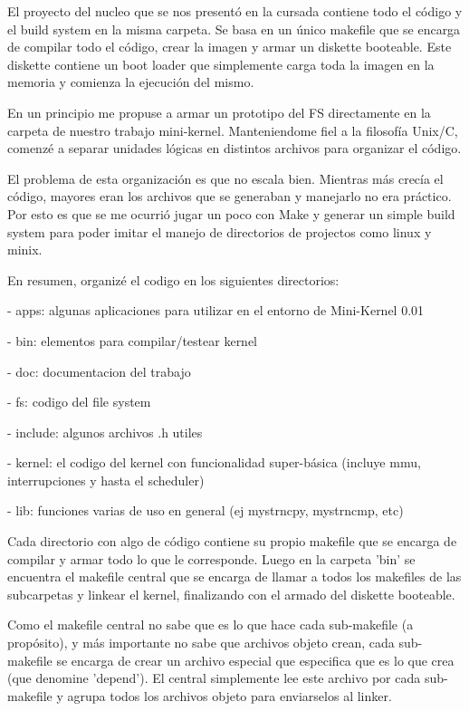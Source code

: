 El proyecto del nucleo que se nos presentó en la cursada contiene todo el código
y el build system en la misma carpeta. Se basa en un único makefile que se
encarga de compilar todo el código, crear la imagen y armar un diskette booteable.
Este diskette contiene un boot loader que simplemente carga toda la imagen en la
memoria y comienza la ejecución del mismo.

En un principio me propuse a armar un prototipo del FS directamente en la
carpeta de nuestro trabajo mini-kernel. Manteniendome fiel a la filosofía
Unix/C, comenzé a separar unidades lógicas en distintos archivos para organizar
el código.

El problema de esta organización es que no escala bien. Mientras más crecía el
código, mayores eran los archivos que se generaban y manejarlo no era práctico.
Por esto es que se me ocurrió jugar un poco con Make y generar un simple build
system para poder imitar el manejo de directorios de projectos como linux y
minix.

En resumen, organizé el codigo en los siguientes directorios:

- apps: algunas aplicaciones para utilizar en el entorno de Mini-Kernel 0.01

- bin: elementos para compilar/testear kernel

- doc: documentacion del trabajo

- fs: codigo del file system

- include: algunos archivos .h utiles

- kernel: el codigo del kernel con funcionalidad super-básica (incluye mmu,
interrupciones y hasta el scheduler)

- lib: funciones varias de uso en general (ej mystrncpy, mystrncmp, etc)

Cada directorio con algo de código contiene su propio makefile que se
encarga de compilar y armar todo lo que le corresponde. Luego en la carpeta
'bin' se encuentra el makefile central que se encarga de llamar a todos los
makefiles de las subcarpetas y linkear el kernel, finalizando con el armado del
diskette booteable.

Como el makefile central no sabe que es lo que hace cada sub-makefile (a
propósito), y más importante no sabe que archivos objeto crean, cada
sub-makefile se encarga de crear un archivo especial que especifica que es lo
que crea (que denomine 'depend'). El central simplemente lee este archivo por
cada sub-makefile y agrupa todos los archivos objeto para enviarselos al linker.

